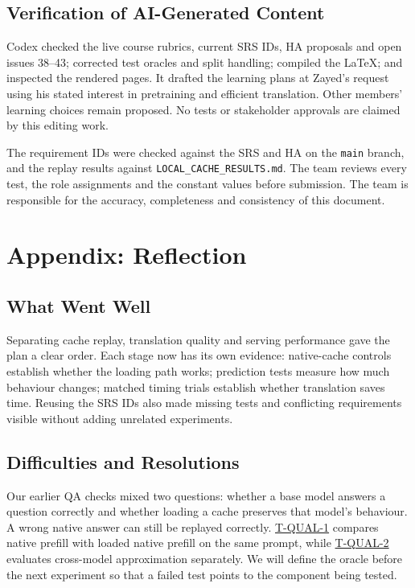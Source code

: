 \documentclass[12pt, titlepage]{article}
\newcommand{\tref}[1]{\hyperref[test:#1]{#1}}
\begin{document}
\subsection{Verification of AI-Generated Content}

Codex checked the live course rubrics, current SRS IDs, HA proposals and
open issues 38--43; corrected test oracles and split handling; compiled the
LaTeX; and inspected the rendered pages. It drafted the learning plans at
Zayed's request using his stated interest in pretraining and efficient
translation. Other members' learning choices remain proposed. No tests or
stakeholder approvals are claimed by this editing work.

The requirement IDs were checked against the SRS and HA on the
\texttt{main} branch, and the replay results against
\texttt{LOCAL\_CACHE\_RESULTS.md}. The team reviews every test, the role
assignments and the constant values before submission. The team is
responsible for the accuracy, completeness and consistency of this
document.

\newpage{}

\section{Appendix: Reflection}
\subsection{What Went Well}
Separating cache replay, translation quality and serving performance gave the plan a clear order. Each stage now has its own evidence: native-cache controls establish whether the loading path works; prediction tests measure how much behaviour changes; matched timing trials establish whether translation saves time. Reusing the SRS IDs also made missing tests and conflicting requirements visible without adding unrelated experiments.

\subsection{Difficulties and Resolutions}
Our earlier QA checks mixed two questions: whether a base model answers a question correctly and whether loading a cache preserves that model's behaviour. A wrong native answer can still be replayed correctly. \tref{T-QUAL-1} compares native prefill with loaded native prefill on the same prompt, while \tref{T-QUAL-2} evaluates cross-model approximation separately. We will define the oracle before the next experiment so that a failed test points to the component being tested.
\end{document}
